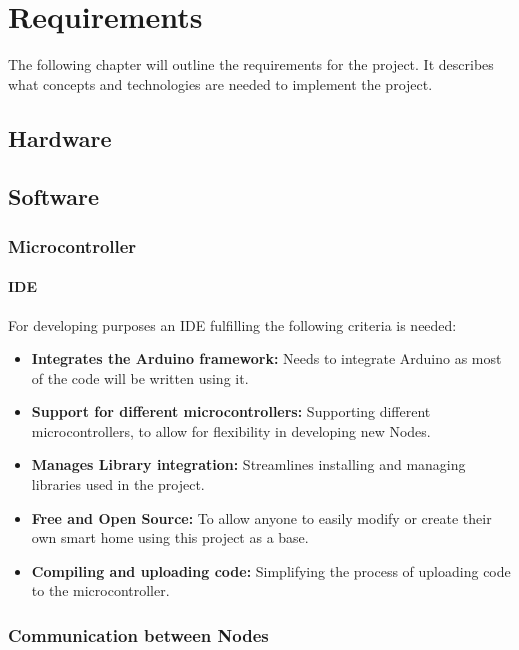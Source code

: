 \chapter{Requirements} 
The following chapter will outline the requirements for the 
project. It describes what concepts and technologies are needed
to implement the project.
    \section{Hardware}
    \section{Software}
        \subsection{Microcontroller}
            \subsubsection{IDE}
            For developing purposes an IDE fulfilling the following criteria is needed:
            \begin{itemize}
                \item \textbf{Integrates the Arduino framework:}
                Needs to integrate Arduino as most of the code will be written using it.
                \item \textbf{Support for different microcontrollers:}
                Supporting different microcontrollers, to allow for flexibility
                in developing new Nodes.
                \item \textbf{Manages Library integration:}
                Streamlines installing and managing libraries used in the project.
                \item \textbf{Free and Open Source:}
                To allow anyone to easily modify  or create their own smart home
                using this project as a base.
                \item \textbf{Compiling and uploading code:} 
                Simplifying the process of uploading code to the microcontroller.
            \end{itemize} 

        \subsection{Communication between Nodes}
        
